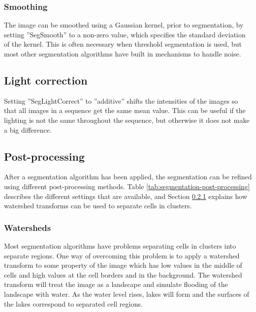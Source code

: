 \documentclass[a4paper, oneside, onecolumn, 11pt]{article}
\newcommand{\setting}[1]{''#1''}
\begin{document}
\subsubsection{Smoothing}
\label{sec:smoothing}
The image can be smoothed using a Gaussian kernel, prior to segmentation, by setting \setting{SegSmooth} to a non-zero value, which specifies the standard deviation of the kernel. This is often necessary when threshold segmentation is used, but most other segmentation algorithms have built in mechanisms to handle noise.

\subsection{Light correction}
Setting \setting{SegLightCorrect} to \setting{additive} shifts the intensities of the images so that all images in a sequence get the same mean value. This can be useful if the lighting is not the same throughout the sequence, but otherwise it does not make a big difference.

\subsection{Post-processing}
\label{sec:segmentation-post-processing}
After a segmentation algorithm has been applied, the segmentation can be refined using different post-processing methods. Table \ref{tab:segmentation-post-processing} describes the different settings that are available, and Section \ref{sec:watersheds} explains how watershed transforms can be used to separate cells in clusters.


\subsubsection{Watersheds}
\label{sec:watersheds}
Most segmentation algorithms have problems separating cells in clusters into separate regions. One way of overcoming this problem is to apply a watershed transform to some property of the image which has low values in the middle of cells and high values at the cell borders and in the background. The watershed transform will treat the image as a landscape and simulate flooding of the landscape with water. As the water level rises, lakes will form and the surfaces of the lakes correspond to separated cell regions.
\end{document}
